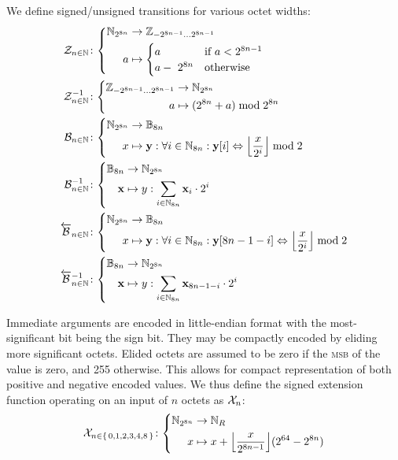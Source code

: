 We define signed/unsigned transitions for various octet widths:
\begin{align}
  \label{eq:signedfunc}
  \signfunc{n \in \N}&\colon\abracegroup{
    \Nbits{8n} &\to \Z_{-2^{8n-1}\dots2^{8n-1}}\\
    a &\mapsto \begin{cases}
      a &\when a < 2^{8n-1} \\
      a -\ 2^{8n} &\otherwise
    \end{cases}
  }\\
  \unsignfunc{n \in \N}&\colon\abracegroup{
    \Z_{-2^{8n-1}\dots2^{8n-1}} &\to \Nbits{8n}\\
    a &\mapsto (2^{8n} + a) \bmod 2^{8n}
  }\\
  \label{eq:bitsfunc}
  \bitsfunc{n\in\N}&\colon\abracegroup{
    \Nbits{8n} &\to \mathbb{B}_{8n}\\
    x &\mapsto \mathbf{y}: \forall i \in \Nmax{8n} : \mathbf{y}[i] \Leftrightarrow \ffrac{x}{2^i}\bmod 2
  }\\
  \unbitsfunc{n\in\N}&\colon\abracegroup{
    \mathbb{B}_{8n} &\to \Nbits{8n}\\
    \mathbf{x} &\mapsto y: \sum_{i \in \Nmax{8n}} \mathbf{x}\sub{i} \cdot 2^i
  }\\
  \label{eq:revbitsfunc}
  \revbitsfunc{n\in\N}&\colon\abracegroup{
    \Nbits{8n} &\to \mathbb{B}_{8n}\\
    x &\mapsto \mathbf{y}: \forall i \in \Nmax{8n} : \mathbf{y}[8n - 1 - i] \Leftrightarrow \ffrac{x}{2^i}\bmod 2
  }\\
  \revunbitsfunc{n\in\N}&\colon\abracegroup{
    \mathbb{B}_{8n} &\to \Nbits{8n}\\
    \mathbf{x} &\mapsto y: \sum_{i \in \Nmax{8n}} \mathbf{x}\sub{8n - 1 - i} \cdot 2^i
  }
\end{align}

Immediate arguments are encoded in little-endian format with the most-significant bit being the sign bit. They may be compactly encoded by eliding more significant octets. Elided octets are assumed to be zero if the \textsc{msb} of the value is zero, and 255 otherwise. This allows for compact representation of both positive and negative encoded values. We thus define the signed extension function operating on an input of $n$ octets as $\mathcal{X}_{n}$:
\begin{align}\label{eq:signedextension}
  \sext_{n \in \set{0, 1, 2, 3, 4, 8}}\colon\abracegroup{
    \Nbits{8n} &\to \pvmreg\\
    x &\mapsto x + \ffrac{x}{2^{8n-1}}(2^{64}-2^{8n})
  }
\end{align}


